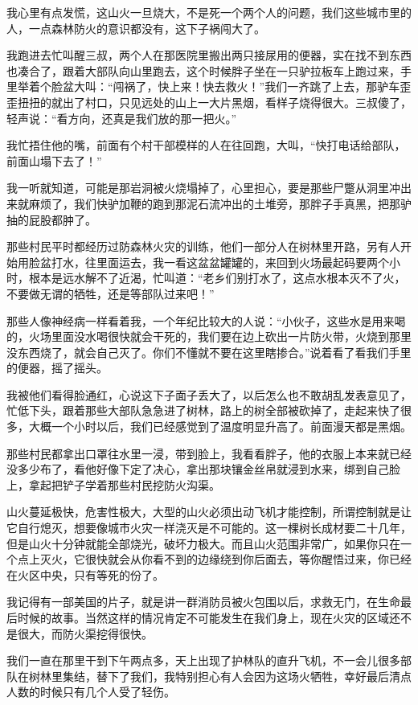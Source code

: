 我心里有点发慌，这山火一旦烧大，不是死一个两个人的问题，我们这些城市里的人，一点森林防火的意识都没有，这下子祸闯大了。

我跑进去忙叫醒三叔，两个人在那医院里搬出两只接尿用的便器，实在找不到东西也凑合了，跟着大部队向山里跑去，这个时候胖子坐在一只驴拉板车上跑过来，手里举着个脸盆大叫：“闯祸了，快上来！快去救火！”我们一齐跳了上去，那驴车歪歪扭扭的就出了村口，只见远处的山上一大片黑烟，看样子烧得很大。三叔傻了，轻声说：“看方向，还真是我们放的那一把火。”

我忙捂住他的嘴，前面有个村干部模样的人在往回跑，大叫，“快打电话给部队，前面山塌下去了！”

我一听就知道，可能是那岩洞被火烧塌掉了，心里担心，要是那些尸蹩从洞里冲出来就麻烦了，我们快驴加鞭的跑到那泥石流冲出的土堆旁，那胖子手真黑，把那驴抽的屁股都肿了。

那些村民平时都经历过防森林火灾的训练，他们一部分人在树林里开路，另有人开始用脸盆打水，往里面运去，我一看这盆盆罐罐的，来回到火场最起码要两个小时，根本是远水解不了近渴，忙叫道：“老乡们别打水了，这点水根本灭不了火，不要做无谓的牺牲，还是等部队过来吧！”

那些人像神经病一样看着我，一个年纪比较大的人说：“小伙子，这些水是用来喝的，火场里面没水喝很快就会干死的，我们要在边上砍出一片防火带，火烧到那里没东西烧了，就会自己灭了。你们不懂就不要在这里瞎掺合。”说着看了看我们手里的便器，摇了摇头。

我被他们看得脸通红，心说这下子面子丢大了，以后怎么也不敢胡乱发表意见了，忙低下头，跟着那些大部队急急进了树林，路上的树全部被砍掉了，走起来快了很多，大概一个小时以后，我们已经感觉到了温度明显升高了。前面漫天都是黑烟。

那些村民都拿出口罩往水里一浸，带到脸上，我看看胖子，他的衣服上本来就已经没多少布了，看他好像下定了决心，拿出那块镶金丝帛就浸到水来，绑到自己脸上，拿起把铲子学着那些村民挖防火沟渠。

山火蔓延极快，危害性极大，大型的山火必须出动飞机才能控制，所谓控制就是让它自行熄灭，想要像城市火灾一样浇灭是不可能的。这一棵树长成材要二十几年，但是山火十分钟就能全部烧光，破坏力极大。而且山火范围非常广，如果你只在一个点上灭火，它很快就会从你看不到的边缘绕到你后面去，等你醒悟过来，你已经在火区中央，只有等死的份了。

我记得有一部美国的片子，就是讲一群消防员被火包围以后，求救无门，在生命最后时候的故事。当然这样的情况肯定不可能发生在我们身上，现在火灾的区域还不是很大，而防火渠挖得很快。

我们一直在那里干到下午两点多，天上出现了护林队的直升飞机，不一会儿很多部队在树林里集结，替下了我们，我特别担心有人会因为这场火牺牲，幸好最后清点人数的时候只有几个人受了轻伤。

